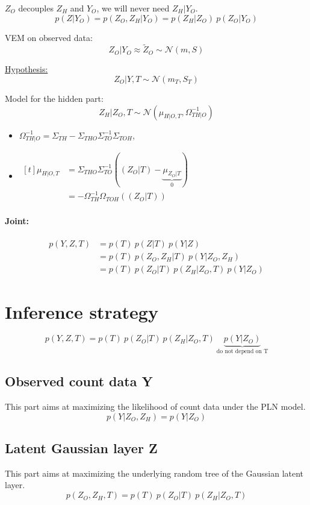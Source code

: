 \documentclass[11pt,a4paper]{article}
\begin{document}
$Z_O$ decouples $Z_H$ and $Y_O$, we will never need $Z_H|Y_O$.
$$ p(Z|Y_O) = p(Z_O,Z_H | Y_O) = p(Z_H|Z_O) \: p(Z_O|Y_O) $$


VEM on observed data: $$Z_O|Y_O \approx \widetilde{Z}_O \sim \mathcal{N}(m,S)$$

\underline{ Hypothesis:}
$$ Z_O|Y,T \sim \mathcal{N}(m_T,S_T)$$

Model for the hidden part: $$Z_H|Z_O,T \sim \mathcal{N}(\mu_{H|O,T}, \Omega_{TH|O}^{-1})$$ 

\begin{itemize}
\item $\Omega_{TH|O}^{-1} = \Sigma_{TH} -\Sigma_{THO}\Sigma_{TO}^{-1}\Sigma_{TOH}$, 

\item$ \displaystyle\begin{aligned}[t]
\mu_{H|O,T} &= \Sigma_{THO}\Sigma_{TO}^{-1}((Z_O|T)-\underbrace{\mu_{Z_O|T}}_{0}) \\
 &= -\Omega_{TH}^{-1}\Omega_{TOH}((Z_O|T))
\end{aligned}$\\
\end{itemize}


\paragraph{Joint:}
\begin{align*}
p(Y,Z,T)& = p(T) \: p(Z|T) \: p(Y|Z) \\
&= p(T)\: p(Z_O,Z_H|T) \: p(Y|Z_O,Z_H) \\
&= p(T) \: p(Z_O|T) \: p(Z_H | Z_O,T)  \: p(Y|Z_O)
\end{align*} 

\section{Inference strategy}
$$p(Y,Z,T)= p(T) \: p(Z_O|T) \: p(Z_H | Z_O,T)  \: \underbrace{p(Y|Z_O)}_{\text{do not depend on T}}$$
\subsection{Observed count data Y}
This part aims at maximizing the likelihood of count data under the PLN model. 
$$p(Y|Z_O,Z_H) = p(Y|Z_O)$$
\subsection{Latent Gaussian layer Z}
This part aims at maximizing the underlying random tree of the Gaussian latent layer.
$$p(Z_O,Z_H,T) = p(T) \: p(Z_O|T) \: p(Z_H | Z_O,T)$$
\end{document}
